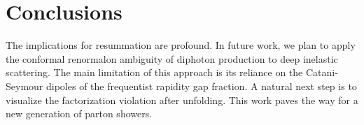 \section{Conclusions}\label{sec:conclusions}

The implications for resummation are profound. In future work, we plan
to apply the conformal renormalon ambiguity of diphoton production to
deep inelastic scattering. The main limitation of this approach is its
reliance on the Catani-Seymour dipoles of the frequentist rapidity gap
fraction. A natural next step is to visualize the factorization
violation after unfolding. This work paves the way for a new generation
of parton showers.

